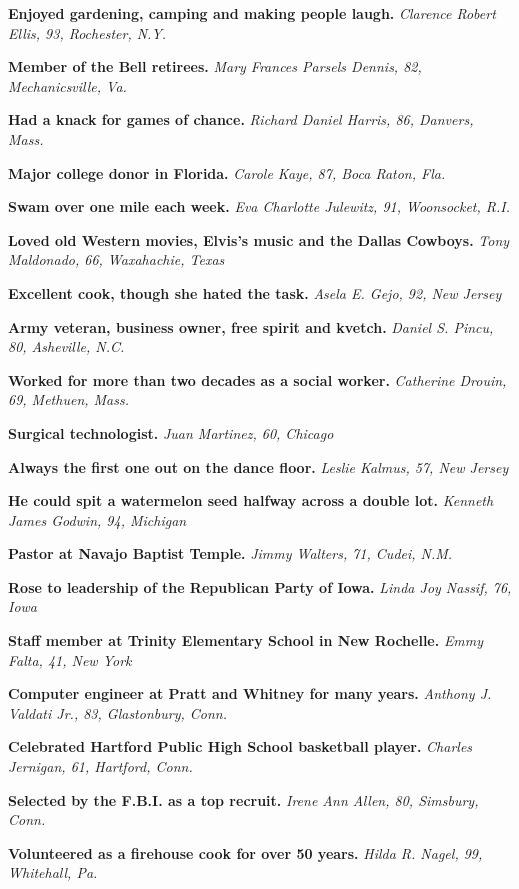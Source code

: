 \textbf{Enjoyed gardening, camping and making people laugh.}
\emph{Clarence Robert Ellis, 93, Rochester, N.Y.}

\textbf{Member of the Bell retirees.} \emph{Mary Frances Parsels Dennis,
82, Mechanicsville, Va.}

\textbf{Had a knack for games of chance.} \emph{Richard Daniel Harris,
86, Danvers, Mass.}

\textbf{Major college donor in Florida.} \emph{Carole Kaye, 87, Boca
Raton, Fla.}

\textbf{Swam over one mile each week.} \emph{Eva Charlotte Julewitz, 91,
Woonsocket, R.I.}

\textbf{Loved old Western movies, Elvis's music and the Dallas Cowboys.}
\emph{Tony Maldonado, 66, Waxahachie, Texas}

\textbf{Excellent cook, though she hated the task.} \emph{Asela E. Gejo,
92, New Jersey}

\textbf{Army veteran, business owner, free spirit and kvetch.}
\emph{Daniel S. Pincu, 80, Asheville, N.C.}

\textbf{Worked for more than two decades as a social worker.}
\emph{Catherine Drouin, 69, Methuen, Mass.}

\textbf{Surgical technologist.} \emph{Juan Martinez, 60, Chicago}

\textbf{Always the first one out on the dance floor.} \emph{Leslie
Kalmus, 57, New Jersey}

\textbf{He could spit a watermelon seed halfway across a double lot.}
\emph{Kenneth James Godwin, 94, Michigan}

\textbf{Pastor at Navajo Baptist Temple.} \emph{Jimmy Walters, 71,
Cudei, N.M.}

\textbf{Rose to leadership of the Republican Party of Iowa.} \emph{Linda
Joy Nassif, 76, Iowa}

\textbf{Staff member at Trinity Elementary School in New Rochelle.}
\emph{Emmy Falta, 41, New York}

\textbf{Computer engineer at Pratt and Whitney for many years.}
\emph{Anthony J. Valdati Jr., 83, Glastonbury, Conn.}

\textbf{Celebrated Hartford Public High School basketball player.}
\emph{Charles Jernigan, 61, Hartford, Conn.}

\textbf{Selected by the F.B.I. as a top recruit.} \emph{Irene Ann Allen,
80, Simsbury, Conn.}

\textbf{Volunteered as a firehouse cook for over 50 years.} \emph{Hilda
R. Nagel, 99, Whitehall, Pa.}

